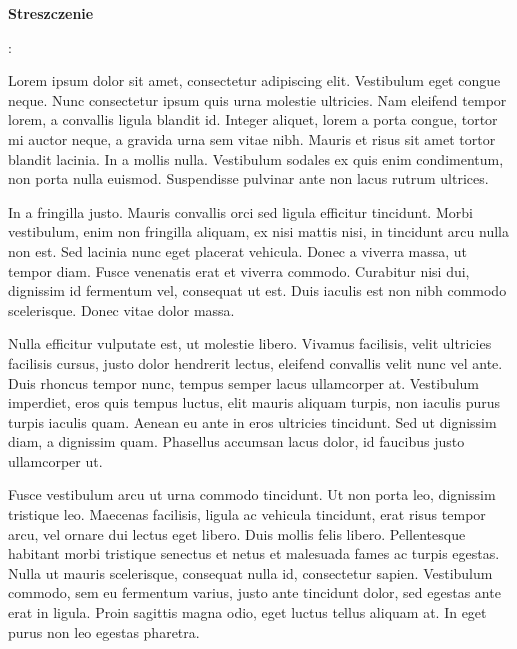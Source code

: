 
    \cleardoublepage
    \vspace*{2\baselineskip}
    \begin{center}
	{\large\bfseries Streszczenie}\par\bigskip\end{center}
 : \tytulpl
 \par
    \vspace*{1\baselineskip}
    {
  	Lorem ipsum dolor sit amet, consectetur adipiscing elit. Vestibulum eget congue neque. Nunc consectetur ipsum quis urna molestie ultricies. Nam eleifend tempor lorem, a convallis ligula blandit id. Integer aliquet, lorem a porta congue, tortor mi auctor neque, a gravida urna sem vitae nibh. Mauris et risus sit amet tortor blandit lacinia. In a mollis nulla. Vestibulum sodales ex quis enim condimentum, non porta nulla euismod. Suspendisse pulvinar ante non lacus rutrum ultrices.

	In a fringilla justo. Mauris convallis orci sed ligula efficitur tincidunt. Morbi vestibulum, enim non fringilla aliquam, ex nisi mattis nisi, in tincidunt arcu nulla non est. Sed lacinia nunc eget placerat vehicula. Donec a viverra massa, ut tempor diam. Fusce venenatis erat et viverra commodo. Curabitur nisi dui, dignissim id fermentum vel, consequat ut est. Duis iaculis est non nibh commodo scelerisque. Donec vitae dolor massa.

	Nulla efficitur vulputate est, ut molestie libero. Vivamus facilisis, velit ultricies facilisis cursus, justo dolor hendrerit lectus, eleifend convallis velit nunc vel ante. Duis rhoncus tempor nunc, tempus semper lacus ullamcorper at. Vestibulum imperdiet, eros quis tempus luctus, elit mauris aliquam turpis, non iaculis purus turpis iaculis quam. Aenean eu ante in eros ultricies tincidunt. Sed ut dignissim diam, a dignissim quam. Phasellus accumsan lacus dolor, id faucibus justo ullamcorper ut.

	Fusce vestibulum arcu ut urna commodo tincidunt. Ut non porta leo, dignissim tristique leo. Maecenas facilisis, ligula ac vehicula tincidunt, erat risus tempor arcu, vel ornare dui lectus eget libero. Duis mollis felis libero. Pellentesque habitant morbi tristique senectus et netus et malesuada fames ac turpis egestas. Nulla ut mauris scelerisque, consequat nulla id, consectetur sapien. Vestibulum commodo, sem eu fermentum varius, justo ante tincidunt dolor, sed egestas ante erat in ligula. Proin sagittis magna odio, eget luctus tellus aliquam at. In eget purus non leo egestas pharetra.

}
